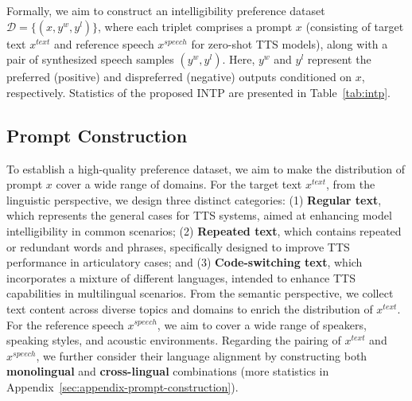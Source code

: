\documentclass[11pt]{article}
\begin{document}

Formally, we aim to construct an intelligibility preference dataset $\mathcal{D} = \{(x, y^w, y^l)\}$, where each triplet comprises a prompt $x$ (consisting of target text $x^{text}$ and reference speech $x^{speech}$ for zero-shot TTS models), along with a pair of synthesized speech samples $(y^w, y^l)$. Here, $y^w$ and $y^l$ represent the preferred (positive) and dispreferred (negative) outputs conditioned on $x$, respectively. Statistics of the proposed INTP are presented in Table~\ref{tab:intp}. 

\subsection{Prompt Construction}\label{sec:prompt-construction}

To establish a high-quality preference dataset, we aim to make the distribution of prompt $x$ cover a wide range of domains. For the target text $x^{text}$, from the linguistic perspective, we design three distinct categories: (1) \textbf{Regular text}, which represents the general cases for TTS systems, aimed at enhancing model intelligibility in common scenarios; (2) \textbf{Repeated text}, which contains repeated or redundant words and phrases, specifically designed to improve TTS performance in articulatory cases; and (3) \textbf{Code-switching text}, which incorporates a mixture of different languages, intended to enhance TTS capabilities in multilingual scenarios. From the semantic perspective, we collect text content across diverse topics and domains to enrich the distribution of $x^{text}$. For the reference speech $x^{speech}$, we aim to cover a wide range of speakers, speaking styles, and acoustic environments. Regarding the pairing of $x^{text}$ and $x^{speech}$, we further consider their language alignment by constructing both \textbf{monolingual} and \textbf{cross-lingual} combinations (more statistics in Appendix~\ref{sec:appendix-prompt-construction}).
\end{document}
